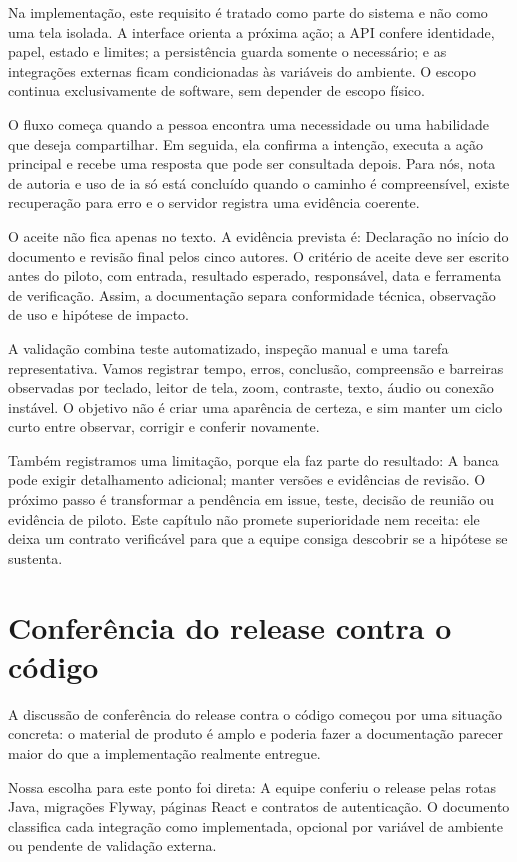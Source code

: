 \documentclass[12pt,oneside,a4paper,article]{abntex2}
\begin{document}
Na implementação, este requisito é tratado como parte do sistema e não como uma tela isolada. A interface orienta a próxima ação; a API confere identidade, papel, estado e limites; a persistência guarda somente o necessário; e as integrações externas ficam condicionadas às variáveis do ambiente. O escopo continua exclusivamente de software, sem depender de escopo físico.

O fluxo começa quando a pessoa encontra uma necessidade ou uma habilidade que deseja compartilhar. Em seguida, ela confirma a intenção, executa a ação principal e recebe uma resposta que pode ser consultada depois. Para nós, nota de autoria e uso de ia só está concluído quando o caminho é compreensível, existe recuperação para erro e o servidor registra uma evidência coerente.

O aceite não fica apenas no texto. A evidência prevista é: Declaração no início do documento e revisão final pelos cinco autores. O critério de aceite deve ser escrito antes do piloto, com entrada, resultado esperado, responsável, data e ferramenta de verificação. Assim, a documentação separa conformidade técnica, observação de uso e hipótese de impacto.

A validação combina teste automatizado, inspeção manual e uma tarefa representativa. Vamos registrar tempo, erros, conclusão, compreensão e barreiras observadas por teclado, leitor de tela, zoom, contraste, texto, áudio ou conexão instável. O objetivo não é criar uma aparência de certeza, e sim manter um ciclo curto entre observar, corrigir e conferir novamente.

Também registramos uma limitação, porque ela faz parte do resultado: A banca pode exigir detalhamento adicional; manter versões e evidências de revisão. O próximo passo é transformar a pendência em issue, teste, decisão de reunião ou evidência de piloto. Este capítulo não promete superioridade nem receita: ele deixa um contrato verificável para que a equipe consiga descobrir se a hipótese se sustenta.

\section{Conferência do release contra o código}
A discussão de conferência do release contra o código começou por uma situação concreta: o material de produto é amplo e poderia fazer a documentação parecer maior do que a implementação realmente entregue.

Nossa escolha para este ponto foi direta: A equipe conferiu o release pelas rotas Java, migrações Flyway, páginas React e contratos de autenticação. O documento classifica cada integração como implementada, opcional por variável de ambiente ou pendente de validação externa.
\end{document}
